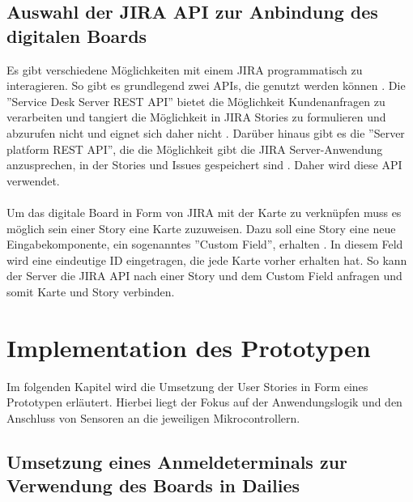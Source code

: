 \documentclass[12pt,titlepage]{scrartcl}
\begin{document}
		\subsection{Auswahl der JIRA API zur Anbindung des digitalen Boards} \label{decideJira}
		Es gibt verschiedene Möglichkeiten mit einem JIRA programmatisch zu interagieren. So gibt es grundlegend zwei APIs, die genutzt werden können \cite{jiraapi}. Die ''Service Desk Server REST API'' bietet die Möglichkeit Kundenanfragen zu verarbeiten und tangiert die Möglichkeit in JIRA Stories zu formulieren und abzurufen nicht und eignet sich daher nicht \cite{jiraserviceapi}. Darüber hinaus gibt es die ''Server platform REST API'', die die Möglichkeit gibt die JIRA Server-Anwendung anzusprechen, in der Stories und Issues gespeichert sind \cite{jiraserverapi}. Daher wird diese API verwendet.\\ \\
		Um das digitale Board in Form von JIRA mit der Karte zu verknüpfen muss es möglich sein einer Story eine Karte zuzuweisen. Dazu soll eine Story eine neue Eingabekomponente, ein sogenanntes ''Custom Field'', erhalten \cite{jiracustomfield}. In diesem Feld wird eine eindeutige ID eingetragen, die jede Karte vorher erhalten hat. So kann der Server die JIRA API nach einer Story und dem Custom Field anfragen und somit Karte und Story verbinden. 
	\newpage
	\section{Implementation des Prototypen} \label{impl}
	Im folgenden Kapitel wird die Umsetzung der User Stories in Form eines Prototypen erläutert. Hierbei liegt der Fokus auf der Anwendungslogik und den Anschluss von Sensoren an die jeweiligen Mikrocontrollern.
		\subsection{Umsetzung eines Anmeldeterminals zur Verwendung des Boards in Dailies}
\end{document}
